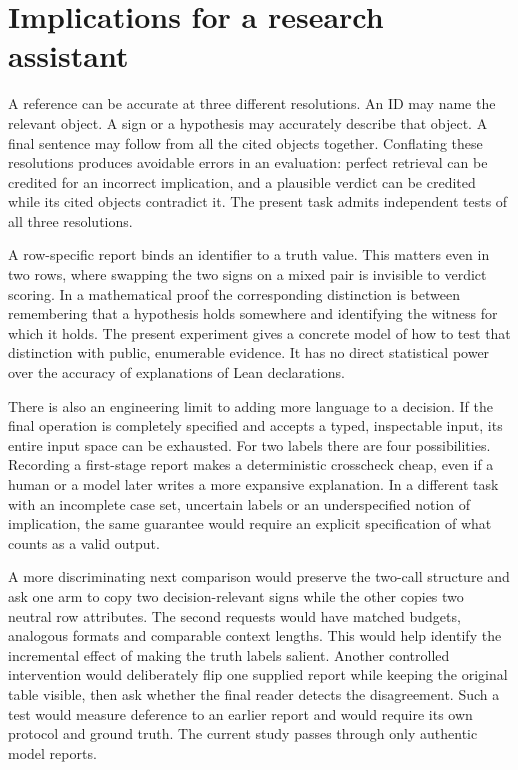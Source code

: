 \documentclass[12pt,letterpaper]{article}
\begin{document}
\section{Implications for a research assistant}
A reference can be accurate at three different resolutions. An ID may name the relevant object. A sign or a hypothesis may accurately describe that object. A final sentence may follow from all the cited objects together. Conflating these resolutions produces avoidable errors in an evaluation: perfect retrieval can be credited for an incorrect implication, and a plausible verdict can be credited while its cited objects contradict it. The present task admits independent tests of all three resolutions.

A row-specific report binds an identifier to a truth value. This matters even in two rows, where swapping the two signs on a mixed pair is invisible to verdict scoring. In a mathematical proof the corresponding distinction is between remembering that a hypothesis holds somewhere and identifying the witness for which it holds. The present experiment gives a concrete model of how to test that distinction with public, enumerable evidence. It has no direct statistical power over the accuracy of explanations of Lean declarations.

There is also an engineering limit to adding more language to a decision. If the final operation is completely specified and accepts a typed, inspectable input, its entire input space can be exhausted. For two labels there are four possibilities. Recording a first-stage report makes a deterministic crosscheck cheap, even if a human or a model later writes a more expansive explanation. In a different task with an incomplete case set, uncertain labels or an underspecified notion of implication, the same guarantee would require an explicit specification of what counts as a valid output.

A more discriminating next comparison would preserve the two-call structure and ask one arm to copy two decision-relevant signs while the other copies two neutral row attributes. The second requests would have matched budgets, analogous formats and comparable context lengths. This would help identify the incremental effect of making the truth labels salient. Another controlled intervention would deliberately flip one supplied report while keeping the original table visible, then ask whether the final reader detects the disagreement. Such a test would measure deference to an earlier report and would require its own protocol and ground truth. The current study passes through only authentic model reports.
\end{document}
